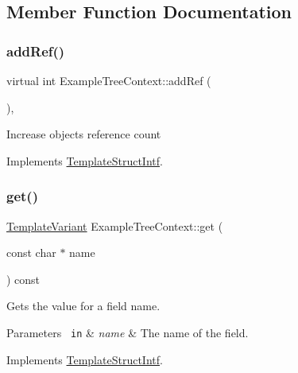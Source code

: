 \subsection{Member Function Documentation}
\mbox{\label{class_example_tree_context_a217c6d4ffff27298d9ca020f81e4a958}} 
\subsubsection{\texorpdfstring{addRef()}{addRef()}}
{\footnotesize\ttfamily virtual int Example\+Tree\+Context\+::add\+Ref (\begin{DoxyParamCaption}{ }\end{DoxyParamCaption})\hspace{0.3cm}{\ttfamily [inline]}, {\ttfamily [virtual]}}

Increase object\textquotesingle{}s reference count 

Implements \mbox{\hyperlink{class_template_struct_intf_a05fe97ad47633beb326f69686faed581}{Template\+Struct\+Intf}}.

\mbox{\label{class_example_tree_context_a5ac1d50a13e3ee839f34864d828aafcb}} 
\subsubsection{\texorpdfstring{get()}{get()}}
{\footnotesize\ttfamily \mbox{\hyperlink{class_template_variant}{Template\+Variant}} Example\+Tree\+Context\+::get (\begin{DoxyParamCaption}\item[{const char $\ast$}]{name }\end{DoxyParamCaption}) const\hspace{0.3cm}{\ttfamily [virtual]}}

Gets the value for a field name. 
\begin{DoxyParams}[1]{Parameters}
\mbox{\texttt{ in}}  & {\em name} & The name of the field. \\
\hline
\end{DoxyParams}


Implements \mbox{\hyperlink{class_template_struct_intf_a3d610cb81b4adbb531ebed3aa3d09b51}{Template\+Struct\+Intf}}.

